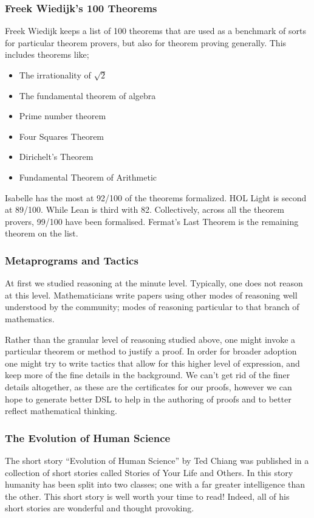 \documentclass{beamer}
\theoremstyle{indentDefn} \newtheorem{defn}[]{Definition}
\begin{document}
\begin{frame}
	\frametitle{Freek Wiedijk's 100 Theorems}
	
	Freek Wiedijk keeps a list of 100 theorems that are used as a benchmark of sorts for particular theorem provers, but also for theorem proving generally. This includes theorems like; 
	
	\begin{itemize}
		\item[] The irrationality of $\sqrt{2}$
		\item[] The fundamental theorem of algebra 
		\item[] Prime number theorem 
		\item[] Four Squares Theorem 
		\item[] Dirichelt's Theorem 
		\item[] Fundamental Theorem of Arithmetic	
	\end{itemize}
	
	Isabelle has the most at 92/100 of the theorems formalized. HOL Light is second at 89/100. While Lean is third with 82. Collectively, across all the theorem provers, 99/100 have been formalised. Fermat's Last Theorem is the remaining theorem on the list.
\end{frame}

\begin{frame}
	\frametitle{Metaprograms and Tactics}
	
	At first we studied reasoning at the minute level. Typically, one does not reason at this level. Mathematicians write papers using other modes of reasoning well understood by the community; modes of reasoning particular to that branch of mathematics. 
	
	Rather than the granular level of reasoning studied above, one might invoke a particular theorem or method to justify a proof. In order for broader adoption one might try to write tactics that allow for this higher level of expression, and keep more of the fine details in the background. We can't get rid of the finer details altogether, as these are the certificates for our proofs, however we can hope to generate better DSL to help in the authoring of proofs and to better reflect mathematical thinking. 

\end{frame}

\begin{frame}
	\frametitle{The Evolution of Human Science}
	
	The short story ``Evolution of Human Science'' by Ted Chiang was published in a collection of short stories called Stories of Your Life and Others. In this story humanity has been split into two classes; one with a far greater intelligence than the other. This short story is well worth your time to read! Indeed, all of his short stories are wonderful and thought provoking.

\end{frame}
\end{document}
